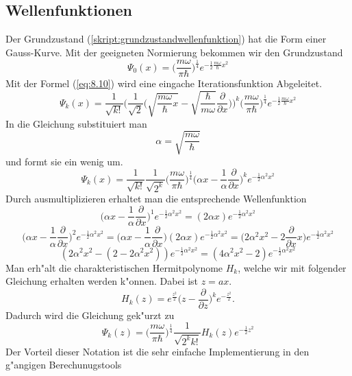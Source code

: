 \begin{refsection}
\subsection{Wellenfunktionen}
Der Grundzustand (\ref{skript:grundzustandwellenfunktion}) hat die Form einer Gauss-Kurve. Mit der geeigneten Normierung bekommen wir den Grundzustand
\[
\Psi_0(x)
=
\biggl(\frac{m\omega}{\pi\hbar}\biggr)^\frac14
e^{-\frac12\frac{m\omega}{\hbar}x^2}
\]
Mit der Formel (\ref{eq:8.10}) wird eine eingache Iterationsfunktion Abgeleitet.
\[
\Psi_k(x)
=
\frac1{\sqrt{k!}}\biggl(\frac1{\sqrt{2}}
\biggl(\sqrt{\frac{m\omega}{\hbar}x}-
\sqrt{\frac{\hbar}{m\omega}}\frac{\partial}{\partial x}\biggr)\biggr)^k
\biggl(\frac{m\omega}{\pi\hbar}\biggr)^\frac14
e^{-\frac12\frac{m\omega}{\hbar}x^2}
\]
In die Gleichung substituiert man
\[
\alpha=\sqrt{\frac{m\omega}\hbar}
\]
und formt sie ein wenig um.
\[
\Psi_k(x)
=
\frac1{\sqrt{k!}}\frac1{\sqrt{2^k}}
\biggl(\frac{m\omega}{\pi\hbar}\biggr)^\frac14
\biggl(\alpha x-\frac1{\alpha}\frac{\partial}{\partial x}\biggr)^k
e^{-\frac12\alpha^2x^2}
\]
Durch ausmultiplizieren erhaltet man die entsprechende Wellenfunktion
\[
\biggl(\alpha x-\frac1{\alpha}\frac{\partial}{\partial x}\biggr)^1
e^{-\frac12\alpha^2x^2}
=
(2\alpha x)e^{-\frac12\alpha^2x^2}
\]
\[
\biggl(\alpha x-\frac1{\alpha}\frac{\partial}{\partial x}\biggr)^2
e^{-\frac12\alpha^2x^2}
=
\biggl(\alpha x-\frac1{\alpha}\frac{\partial}{\partial x}\biggr)
(2\alpha x)e^{-\frac12\alpha^2x^2}
=
\biggl(2\alpha^2 x^2-2\frac{\partial}{\partial x}x\biggr)
e^{-\frac12\alpha^2x^2}
\]
\[
(2\alpha^2x^2-(2-2\alpha^2x^2))e^{-\frac12\alpha^2x^2}
=
(4\alpha^2x^2-2)e^{-\frac12\alpha^2x^2}
\]
Man erh"alt die charakteristischen Hermitpolynome $H_k$, welche wir mit folgender Gleichung erhalten werden k"onnen. Dabei ist $z=ax$.
\[
H_k(z)
=
e^{\frac{z^2}2}\biggl(z-\frac{\partial}{\partial z}\biggr)^k
e^{-\frac{z^2}2}.
\]
Dadurch wird die Gleichung gek"urzt zu
\[
\Psi_k(z)
=
\biggl(\frac{m\omega}{\pi\hbar}\biggr)^\frac14
\frac1{\sqrt{2^k k!}}H_k(z)
e^{-\frac12 z^2}
\]
Der Vorteil dieser Notation ist die sehr einfache Implementierung in den g"angigen Berechunugstools


\end{refsection}
